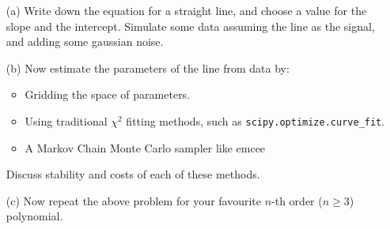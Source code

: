 \documentclass{article} %
\begin{document}
\begin{enumerate}
	
	\item[(a)] Write down the equation for a straight line, and choose a value for the slope and the intercept. Simulate some data assuming the line as the signal, and adding some gaussian noise. 
	
	\item[(b)] Now estimate the parameters of the line from data by:
	\begin{itemize}
		\item Gridding the space of parameters.
		\item Using traditional $ \chi^2$ fitting methods, such as \texttt{scipy.optimize.curve\_fit}.
		\item A Markov Chain Monte Carlo sampler like emcee
	\end{itemize}
	Discuss stability and costs of each of these methods.
	
	
	\item[(c)] Now repeat the above problem for your favourite  $n$-th order ($n\ge3$)  polynomial.
	
\end{enumerate}
\end{document}
